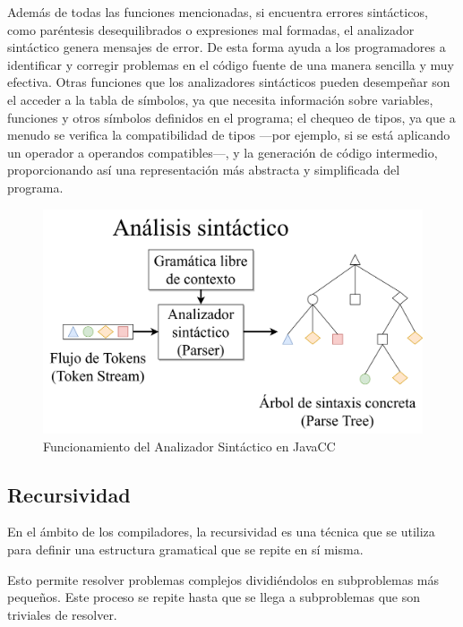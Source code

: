 Además de todas las funciones mencionadas, si encuentra errores sintácticos, como paréntesis desequilibrados o expresiones mal formadas, el analizador sintáctico genera mensajes de error\cite{traductorescompiladoreseinterpretes}. De esta forma ayuda a los programadores a identificar y corregir problemas en el código fuente de una manera sencilla y muy efectiva. Otras funciones que los analizadores sintácticos pueden desempeñar son el acceder a la tabla de símbolos, ya que necesita información sobre variables, funciones y otros símbolos definidos en el programa; el chequeo de tipos, ya que a menudo se verifica la compatibilidad de tipos ---por ejemplo, si se está aplicando un operador a operandos compatibles---, y la generación de código intermedio, proporcionando así una representación más abstracta y simplificada del programa.

\begin{figure}[H]
	\centering
	\includegraphics[width=\textwidth]{imagenes/analizadorsintactico.png}
	\caption{\label{fig:analizadorsintactico}Funcionamiento del Analizador Sintáctico en JavaCC\cite{ytanalizadorsintactico}}
\end{figure}

\subsection{Recursividad}

\noindent En el ámbito de los compiladores, la recursividad es una técnica que se utiliza para definir una estructura gramatical que se repite en sí misma.

Esto permite resolver problemas complejos dividiéndolos en subproblemas más pequeños. Este proceso se repite hasta que se llega a subproblemas que son triviales de resolver.

